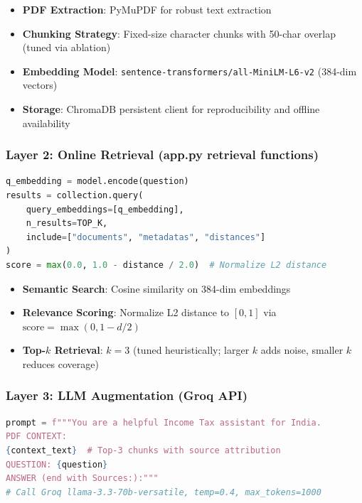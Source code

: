 \documentclass[11pt,a4paper]{article}
\begin{document}
\begin{itemize}
    \item \textbf{PDF Extraction}: PyMuPDF for robust text extraction
    \item \textbf{Chunking Strategy}: Fixed-size character chunks with 50-char overlap (tuned via ablation)
    \item \textbf{Embedding Model}: \texttt{sentence-transformers/all-MiniLM-L6-v2} (384-dim vectors)
    \item \textbf{Storage}: ChromaDB persistent client for reproducibility and offline availability
\end{itemize}

\subsubsection{Layer 2: Online Retrieval (app.py retrieval functions)}

\begin{lstlisting}[language=Python, caption={Query-time retrieval and ranking}]
q_embedding = model.encode(question)
results = collection.query(
    query_embeddings=[q_embedding],
    n_results=TOP_K,
    include=["documents", "metadatas", "distances"]
)
score = max(0.0, 1.0 - distance / 2.0)  # Normalize L2 distance
\end{lstlisting}

\begin{itemize}
    \item \textbf{Semantic Search}: Cosine similarity on 384-dim embeddings
    \item \textbf{Relevance Scoring}: Normalize L2 distance to $[0, 1]$ via $\text{score} = \max(0, 1 - d/2)$
    \item \textbf{Top-$k$ Retrieval}: $k=3$ (tuned heuristically; larger $k$ adds noise, smaller $k$ reduces coverage)
\end{itemize}

\subsubsection{Layer 3: LLM Augmentation (Groq API)}

\begin{lstlisting}[language=Python, caption={Prompt construction with context and memory}]
prompt = f"""You are a helpful Income Tax assistant for India.
PDF CONTEXT:
{context_text}  # Top-3 chunks with source attribution
QUESTION: {question}
ANSWER (end with Sources:):"""
# Call Groq llama-3.3-70b-versatile, temp=0.4, max_tokens=1000
\end{lstlisting}
\end{document}
